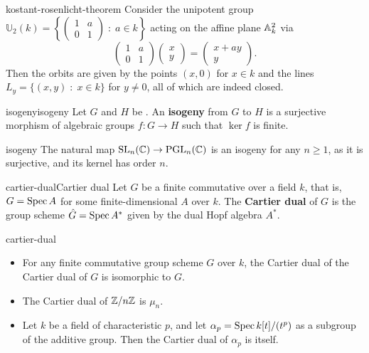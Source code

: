 \begin{example}{kostant-rosenlicht-theorem}
    Consider the unipotent group $\mathbb{U}_2(k) = \left\{ \begin{pmatrix} 1 & a \\ 0 & 1 \end{pmatrix} \;:\; a \in k \right\}$ acting on the affine plane $\AA^2_k$ via
    \[ \begin{pmatrix} 1 & a \\ 0 & 1 \end{pmatrix} \begin{pmatrix} x \\ y \end{pmatrix} = \begin{pmatrix} x + ay \\ y \end{pmatrix} . \]
    Then the orbits are given by the points $(x, 0)$ for $x \in k$ and the lines $L_y = \{ (x, y) \;:\; x \in k \}$ for $y \ne 0$, all of which are indeed closed.
\end{example}

\begin{topic}{isogeny}{isogeny}
    Let $G$ and $H$ be . An \textbf{isogeny} from $G$ to $H$ is a surjective morphism of algebraic groups $f : G \to H$ such that $\ker f$ is finite.
\end{topic}

\begin{example}{isogeny}
    The natural map $\textup{SL}_n(\CC) \to \textup{PGL}_n(\CC)$ is an isogeny for any $n \ge 1$, as it is surjective, and its kernel has order $n$.
\end{example}

\begin{topic}{cartier-dual}{Cartier dual}
    Let $G$ be a finite commutative  over a field $k$, that is, $G = \Spec A$ for some finite-dimensional  $A$ over $k$. The \textbf{Cartier dual} of $G$ is the group scheme $\hat{G} = \Spec A^*$ given by the dual Hopf algebra $A^*$.
\end{topic}

\begin{example}{cartier-dual}
    \begin{itemize}
        \item For any finite commutative group scheme $G$ over $k$, the Cartier dual of the Cartier dual of $G$ is isomorphic to $G$.
        \item The Cartier dual of $\ZZ/n\ZZ$ is $\mu_n$.
        \item Let $k$ be a field of characteristic $p$, and let $\alpha_p = \Spec k[t] / (t^p)$ as a subgroup of the additive group. Then the Cartier dual of $\alpha_p$ is itself.
    \end{itemize}
\end{example}

